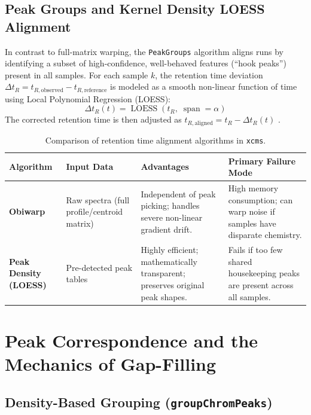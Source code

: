 \documentclass[11pt,twoside,openright]{book}
\begin{document}
\subsection{Peak Groups and Kernel Density LOESS Alignment}

In contrast to full-matrix warping, the \texttt{PeakGroups} algorithm aligns runs by identifying a subset of high-confidence, well-behaved features (``hook peaks'') present in all samples. For each sample $k$, the retention time deviation $\Delta t_R = t_{R, \text{observed}} - t_{R, \text{reference}}$ is modeled as a smooth non-linear function of time using Local Polynomial Regression (LOESS):
\begin{equation}
\label{eq:loess_alignment}
\Delta t_R(t) = \operatorname{LOESS}(t_R, \; \operatorname{span} = \alpha)
\end{equation}
The corrected retention time is then adjusted as $t_{R, \text{aligned}} = t_R - \Delta t_R(t)$ \cite{smith2006xcms}.

\begin{table}[htbp]
\centering
\small
\caption{Comparison of retention time alignment algorithms in \texttt{xcms}.}
\label{tab:alignment_comparison}
\begin{tabularx}{\textwidth}{l p{4.2cm} p{4.2cm} X}
\toprule
\textbf{Algorithm} & \textbf{Input Data} & \textbf{Advantages} & \textbf{Primary Failure Mode} \\
\midrule
\textbf{Obiwarp} & Raw spectra (full profile/centroid matrix) & Independent of peak picking; handles severe non-linear gradient drift. & High memory consumption; can warp noise if samples have disparate chemistry. \\
\addlinespace
\textbf{Peak Density (LOESS)} & Pre-detected peak tables & Highly efficient; mathematically transparent; preserves original peak shapes. & Fails if too few shared housekeeping peaks are present across all samples. \\
\bottomrule
\end{tabularx}
\end{table}

\section{Peak Correspondence and the Mechanics of Gap-Filling}

\subsection{Density-Based Grouping (\texttt{groupChromPeaks})}
\end{document}

